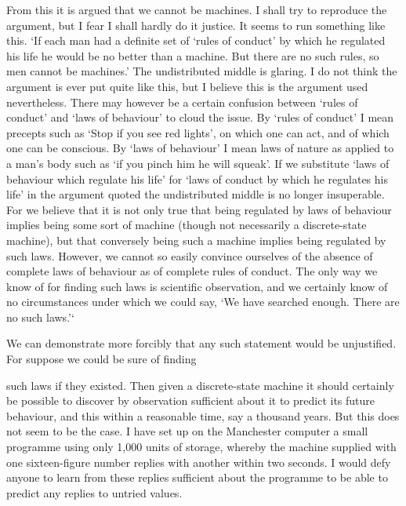 \documentclass[10pt]{article} %
\begin{document}
From this it is argued that we cannot be machines. I shall try to reproduce the argument, but I fear I shall hardly do it justice. It seems to run something like this. `If each man had a definite set of `rules of conduct' by which he regulated his life he would be no better than a machine. But there are no such rules, so men cannot be machines.' The undistributed middle is glaring. I do not think the argument is ever put quite like this, but I believe this is the argument used nevertheless. There may however be a certain confusion between `rules of conduct' and `laws of behaviour' to cloud the issue. By `rules of conduct' I mean precepts such as `Stop if you see red lights', on which one can act, and of which one can be conscious. By `laws of behaviour' I mean laws of nature as applied to a man's body such as `if you pinch him he will squeak'. If we substitute `laws of behaviour which regulate his life' for `laws of conduct by which he regulates his life' in the argument quoted the undistributed middle is no longer insuperable. For we believe that it is not only true that being regulated by laws of behaviour implies being some sort of machine (though not necessarily a discrete-state machine), but that conversely being such a machine implies being regulated by such laws. However, we cannot so easily convince ourselves of the absence of complete laws of behaviour as of complete rules of conduct. The only way we know of for finding such laws is scientific observation, and we certainly know of no circumstances under which we could say, `We have searched enough. There are no such laws.'`

We can demonstrate more forcibly that any such statement would be unjustified. For suppose we could be sure of finding

such laws if they existed. Then given a discrete-state machine it should certainly be possible to discover by observation sufficient about it to predict its future behaviour, and this within a reasonable time, say a thousand years. But this does not seem to be the case. I have set up on the Manchester computer a small programme using only 1,000 units of storage, whereby the machine supplied with one sixteen-figure number replies with another within two seconds. I would defy anyone to learn from these replies sufficient about the programme to be able to predict any replies to untried values.
\vspace{0.5\baselineskip} %
\end{document}
